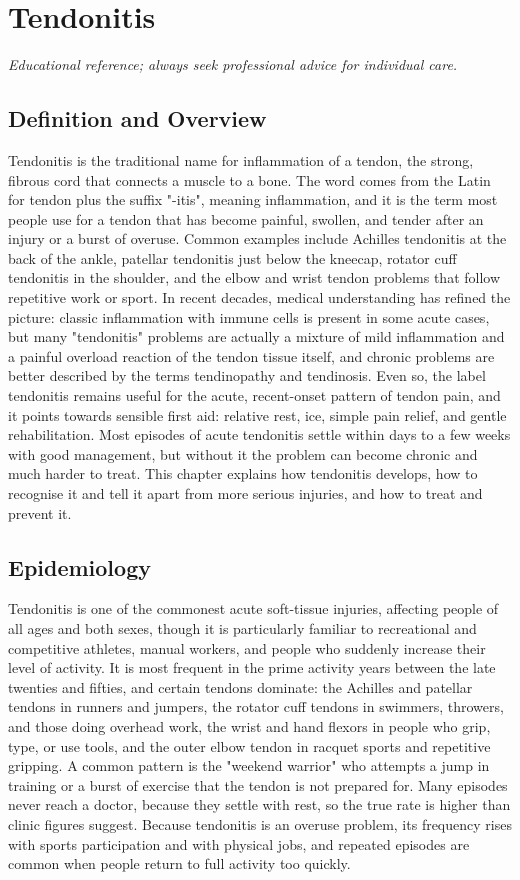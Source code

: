 \chapter{Tendonitis}

\medskip
\noindent\textit{Educational reference; always seek professional advice for individual care.}

\section*{Definition and Overview}
Tendonitis is the traditional name for inflammation of a tendon, the strong, fibrous cord that connects a muscle to a bone. The word comes from the Latin for tendon plus the suffix "-itis", meaning inflammation, and it is the term most people use for a tendon that has become painful, swollen, and tender after an injury or a burst of overuse. Common examples include Achilles tendonitis at the back of the ankle, patellar tendonitis just below the kneecap, rotator cuff tendonitis in the shoulder, and the elbow and wrist tendon problems that follow repetitive work or sport. In recent decades, medical understanding has refined the picture: classic inflammation with immune cells is present in some acute cases, but many "tendonitis" problems are actually a mixture of mild inflammation and a painful overload reaction of the tendon tissue itself, and chronic problems are better described by the terms tendinopathy and tendinosis. Even so, the label tendonitis remains useful for the acute, recent-onset pattern of tendon pain, and it points towards sensible first aid: relative rest, ice, simple pain relief, and gentle rehabilitation. Most episodes of acute tendonitis settle within days to a few weeks with good management, but without it the problem can become chronic and much harder to treat. This chapter explains how tendonitis develops, how to recognise it and tell it apart from more serious injuries, and how to treat and prevent it.

\section*{Epidemiology}
Tendonitis is one of the commonest acute soft-tissue injuries, affecting people of all ages and both sexes, though it is particularly familiar to recreational and competitive athletes, manual workers, and people who suddenly increase their level of activity. It is most frequent in the prime activity years between the late twenties and fifties, and certain tendons dominate: the Achilles and patellar tendons in runners and jumpers, the rotator cuff tendons in swimmers, throwers, and those doing overhead work, the wrist and hand flexors in people who grip, type, or use tools, and the outer elbow tendon in racquet sports and repetitive gripping. A common pattern is the "weekend warrior" who attempts a jump in training or a burst of exercise that the tendon is not prepared for. Many episodes never reach a doctor, because they settle with rest, so the true rate is higher than clinic figures suggest. Because tendonitis is an overuse problem, its frequency rises with sports participation and with physical jobs, and repeated episodes are common when people return to full activity too quickly.

